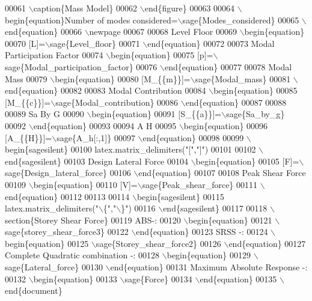 \begin{DoxyCode}
00061    \(\backslash\)caption\{Mass Model\}
00062 \(\backslash\)end\{figure\}
00063 
00064 \(\backslash\)begin\{equation\}Number of modes considered=\(\backslash\)sage\{Modes\_considered\}
00065 \(\backslash\)end\{equation\}
00066 \(\backslash\)newpage
00067 
00068 Level Floor
00069 \(\backslash\)begin\{equation\}
00070    [L]=\(\backslash\)sage\{Level\_floor\}
00071 \(\backslash\)end\{equation\}
00072 
00073 Modal Participation Factor
00074 \(\backslash\)begin\{equation\}
00075     [p]=\(\backslash\)sage\{Modal\_participation\_factor\}
00076 \(\backslash\)end\{equation\}
00077 
00078 Modal Mass
00079 \(\backslash\)begin\{equation\}
00080     [M\_\{\{m\}\}]=\(\backslash\)sage\{Modal\_mass\}
00081 \(\backslash\)end\{equation\}
00082 
00083 Modal Contribution
00084 \(\backslash\)begin\{equation\}
00085    [M\_\{\{c\}\}]=\(\backslash\)sage\{Modal\_contribution\}
00086 \(\backslash\)end\{equation\}
00087 
00088 
00089 Sa By G
00090 \(\backslash\)begin\{equation\}
00091     [S\_\{\{a\}\}]=\(\backslash\)sage\{Sa\_by\_g\}
00092 \(\backslash\)end\{equation\}
00093 
00094 A H
00095 \(\backslash\)begin\{equation\}
00096    [A\_\{\{H\}\}]=\(\backslash\)sage\{A\_h[:,1]\}
00097 \(\backslash\)end\{equation\}
00098 
00099 \(\backslash\)begin\{sagesilent\}
00100 latex.matrix\_delimiters("[","]")
00101 
00102 \(\backslash\)end\{sagesilent\}
00103 Design Lateral Force
00104 \(\backslash\)begin\{equation\}
00105    [F]=\(\backslash\)sage\{Design\_lateral\_force\}
00106 \(\backslash\)end\{equation\}
00107 
00108 Peak Shear Force
00109 \(\backslash\)begin\{equation\}
00110    [V]=\(\backslash\)sage\{Peak\_shear\_force\}
00111 \(\backslash\)end\{equation\}
00112 
00113 
00114 \(\backslash\)begin\{sagesilent\}
00115 latex.matrix\_delimiters("\(\backslash\)\{","\(\backslash\)\}")
00116 \(\backslash\)end\{sagesilent\}
00117 
00118 \(\backslash\)section\{Storey Shear Force\}
00119 ABS-:
00120 \(\backslash\)begin\{equation\}
00121    \(\backslash\)sage\{storey\_shear\_force3\}
00122 \(\backslash\)end\{equation\}
00123 SRSS -:
00124 \(\backslash\)begin\{equation\}
00125    \(\backslash\)sage\{Storey\_shear\_force2\}
00126 \(\backslash\)end\{equation\}
00127 Complete Quadratic combination -:
00128 \(\backslash\)begin\{equation\}
00129    \(\backslash\)sage\{Lateral\_force\}
00130 \(\backslash\)end\{equation\}
00131 Maximum Absolute Response -:
00132 \(\backslash\)begin\{equation\}
00133    \(\backslash\)sage\{Force\}
00134 \(\backslash\)end\{equation\}
00135 \(\backslash\)end\{document\}
\end{DoxyCode}
